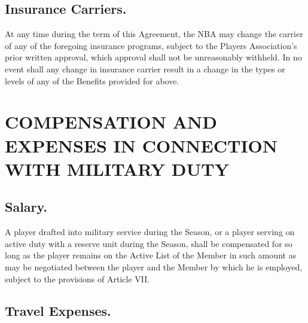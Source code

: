 \documentclass[
]{book}
\begin{document}
\hypertarget{insurance-carriers.}{%
\section{Insurance Carriers.}\label{insurance-carriers.}}

At any time during the term of this Agreement, the NBA may change the carrier of any of the foregoing insurance programs, subject to the Players Association's prior written approval, which approval shall not be unreasonably withheld. In no event shall any change in insurance carrier result in a change in the types or levels of any of the Benefits provided for above.

\hypertarget{compensation-and-expenses-in-connection-with-military-duty}{%
\chapter{COMPENSATION AND EXPENSES IN CONNECTION WITH MILITARY DUTY}\label{compensation-and-expenses-in-connection-with-military-duty}}


\hypertarget{salary.}{%
\section{Salary.}\label{salary.}}

A player drafted into military service during the Season, or a player serving on active duty with a reserve unit during the Season, shall be compensated for so long as the player remains on the Active List of the Member in such amount as may be negotiated between the player and the Member by which he is employed, subject to the provisions of Article VII.

\hypertarget{travel-expenses.}{%
\section{Travel Expenses.}\label{travel-expenses.}}
\end{document}
